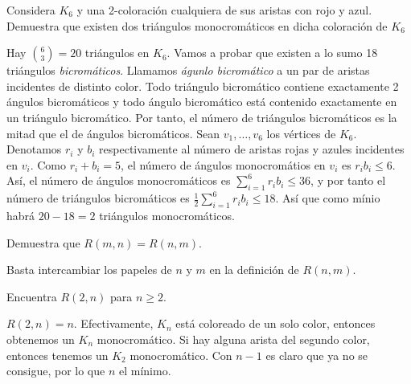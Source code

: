 \documentclass[twoside]{article}
\begin{document}
\newpage

\begin{ejercicio}{2.6}
Considera $K_6$ y una 2-coloración cualquiera de sus aristas con rojo y azul. Demuestra que
existen dos triángulos monocromáticos en dicha coloración de $K_6$
\end{ejercicio}
\begin{solucion}
Hay $\binom{6}{3}=20$ triángulos en $K_6$. Vamos a probar que existen a lo sumo 18 triángulos \emph{bicromáticos}. Llamamos \emph{águnlo bicromático} a un par de aristas incidentes de distinto color. Todo triángulo bicromático contiene exactamente 2 ángulos bicromáticos y todo ángulo bicromático está contenido exactamente en un triángulo bicromático. Por tanto, el número de triángulos bicromáticos es la mitad que el de ángulos bicromáticos. Sean $v_1,\dots, v_6$ los vértices de $K_6$. Denotamos $r_i$ y $b_i$ respectivamente al número de aristas rojas y azules incidentes en $v_i$. Como $r_i+b_i=5$, el número de ángulos monocromátios en $v_i$ es $r_ib_i\leq 6$. Así, el número de ángulos monocromáticos es $\sum_{i=1}^6r_ib_i\leq 36$, y por tanto el número de triángulos bicromáticos es  $\frac{1}{2}\sum_{i=1}^6r_ib_i\leq 18$. Así que como mínio habrá $20-18=2$ triángulos monocromáticos. 


%
\end{solucion}

\newpage

\begin{ejercicio}{2.7}
Demuestra que $R(m, n) = R(n, m)$.
\end{ejercicio}
\begin{solucion}
Basta intercambiar los papeles de $n$ y $m$ en la definición de $R(n,m)$. 
\end{solucion}

\newpage

\begin{ejercicio}{2.8}
Encuentra $R(2, n)$ para $n ≥ 2$.
\end{ejercicio}
\begin{solucion}


$R(2,n)=n$. Efectivamente, $K_n$ está coloreado de un solo color, entonces obtenemos un $K_n$ monocromático. Si hay alguna arista del segundo color, entonces tenemos un $K_2$ monocromático. Con $n-1$ es claro que ya no se consigue, por lo que $n$ el mínimo.


\end{solucion}
\newpage
\end{document}
